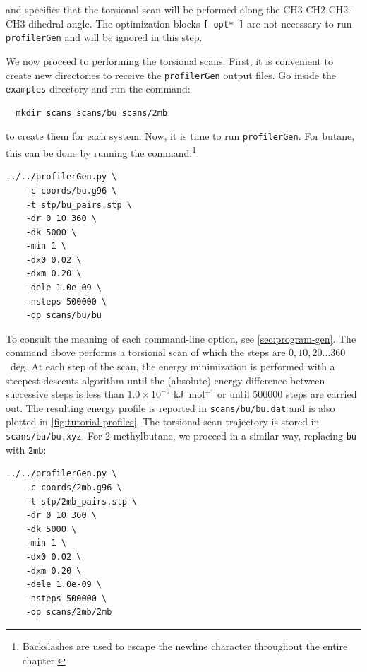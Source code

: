 \documentclass[10pt,a4paper,openany]{memoir}
\numberwithin{equation}{section}
\newcommand{\profilergen}[0]{\texttt{profilerGen}}
\begin{document}
\noindent 
%
and specifies that the torsional scan will be peformed along the
CH3-CH2-CH2-CH3 dihedral angle.
%
The optimization blocks \texttt{[~opt*~]} are not necessary to run
\profilergen{} and will be ignored in this step.

We now proceed to performing the torsional scans.
%
First, it is convenient to create new directories to receive the
\profilergen{} output files. Go inside the \texttt{examples} directory
and run the command:

\begin{lstlisting}
  mkdir scans scans/bu scans/2mb
\end{lstlisting}
\vspace{1ex}\par

\noindent to create them for each system.
%
Now, it is time to run \profilergen{}.
%
For butane, this can be done by running the command:\footnote{Backslashes are used to escape the newline character throughout the entire chapter.}

\begin{lstlisting}
../../profilerGen.py \
    -c coords/bu.g96 \
    -t stp/bu_pairs.stp \
    -dr 0 10 360 \
    -dk 5000 \
    -min 1 \
    -dx0 0.02 \
    -dxm 0.20 \
    -dele 1.0e-09 \
    -nsteps 500000 \
    -op scans/bu/bu
\end{lstlisting}\vspace{1ex}\par

\noindent To consult the meaning of each command-line option, see
\autoref{sec:program-gen}.
%
The command above performs a torsional scan of which the steps are
$0,10,20\ldots360$~deg.
%
At each step of the scan, the energy minimization is performed with a
steepest-descents algorithm until the (absolute) energy difference
between successive steps is less than $1.0\times 10^{-9}$
kJ~mol$^{-1}$ or until 500000 steps are carried out.
%
The resulting energy profile is reported in \texttt{scans/bu/bu.dat}
and is also plotted in \autoref{fig:tutorial-profiles}.
%
The torsional-scan trajectory is stored in \texttt{scans/bu/bu.xyz}.
%
For 2-methylbutane, we proceed in a similar way, replacing \texttt{bu}
with \texttt{2mb}:

\begin{lstlisting}
../../profilerGen.py \
    -c coords/2mb.g96 \
    -t stp/2mb_pairs.stp \
    -dr 0 10 360 \
    -dk 5000 \
    -min 1 \
    -dx0 0.02 \
    -dxm 0.20 \
    -dele 1.0e-09 \
    -nsteps 500000 \
    -op scans/2mb/2mb
\end{lstlisting}\vspace{1ex}\par
\end{document}
